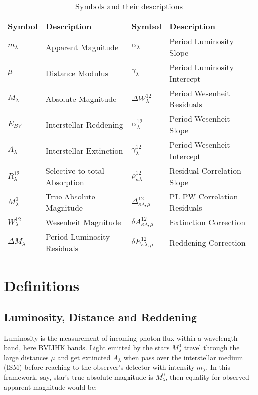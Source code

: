 \documentclass[12pt,a4paper]{article}
\begin{document}
\begin{table}[h]
    \centering
    \small
    \renewcommand{\arraystretch}{1.5}
    \caption*{Symbols and their descriptions}
    \begin{tabular}{ll|ll}
    \hline
    Symbol & Description & Symbol & Description \\ \hline
    $m_\lambda$ & Apparent Magnitude  & $\alpha_{\lambda}$ & Period Luminosity Slope \\
    $\mu$ & Distance Modulus & $\gamma_{\lambda}$ & Period Luminosity Intercept \\
    $M_\lambda$ & Absolute Magnitude  & $\Delta W^{12}_{\lambda}$ & Period Wesenheit Residuals \\
    $E_{BV}$ & Interstellar Reddening  & $\alpha^{12}_{\lambda}$ & Period Wesenheit Slope \\
    $A_\lambda$ & Interstellar Extinction & $\gamma^{12}_{\lambda}$ & Period Wesenheit Intercept \\
    $R_\lambda^{12}$ & Selective-to-total Absorption & $\rho^{12}_{\kappa \lambda}$ & Residual Correlation Slope  \\
    $M_\lambda^0$ & True Absolute Magnitude  & $\Delta^{12}_{\kappa \lambda, \mu}$ & PL-PW Correlation Residuals  \\
    $W_\lambda^{12}$ & Wesenheit Magnitude  & $\delta A^{12}_{\kappa \lambda, \mu}$ & Extinction Correction  \\
    $\Delta M_{\lambda}$ & Period Luminosity Residuals  & $\delta E^{12}_{\kappa \lambda, \mu}$ & Reddening Correction  \\ \hline
    \end{tabular}
    \label{tab:symbols}
    \end{table}

\section{Definitions}

\subsection{Luminosity, Distance and Reddening}
Luminosity is the measurement of incoming photon flux within a wavelength band, here BVIJHK bands. Light emitted by the stars $M_\lambda^0$ travel through the large distances $\mu$ and get extincted $A_\lambda$ when pass over the interstellar medium (ISM) before reaching to the observer's detector with intensity $m_\lambda$. In this framework, say, star's true absolute magnitude is $M_\lambda^0$, then equality for observed apparent magnitude would be:
\end{document}
